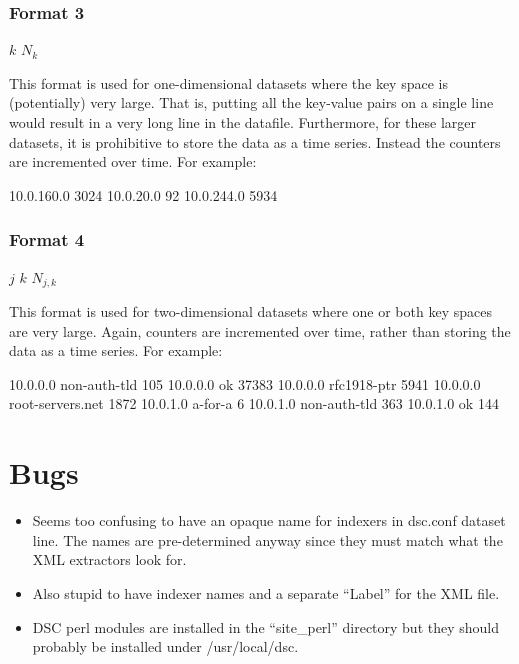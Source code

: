 \documentclass{report}
\begin{document}
\subsection{Format 3}

\noindent
\begin{tt}$k$ $N_{k}$
\end{tt}

\vspace{1ex}\noindent
This format is used for one-dimensional datasets where the key space
is (potentially) very large.  That is, putting all the key-value pairs
on a single line would result in a very long line in the datafile.
Furthermore, for these larger datasets, it is prohibitive to
store the data as a time series.  Instead the counters are incremented
over time.  For example:

\begin{MyVerbatim}
10.0.160.0 3024
10.0.20.0 92
10.0.244.0 5934
\end{MyVerbatim}

\subsection{Format 4}

\noindent
\begin{tt}$j$ $k$ $N_{j,k}$
\end{tt}

\vspace{1ex}\noindent
This format is used for two-dimensional datasets where one or both
key spaces are very large.  Again, counters are incremented over
time, rather than storing the data as a time series.
For example:

\begin{MyVerbatim}
10.0.0.0 non-auth-tld 105
10.0.0.0 ok 37383
10.0.0.0 rfc1918-ptr 5941
10.0.0.0 root-servers.net 1872
10.0.1.0 a-for-a 6
10.0.1.0 non-auth-tld 363
10.0.1.0 ok 144
\end{MyVerbatim}

\chapter{Bugs}

\begin{itemize}

\item
	Seems too confusing to have an opaque name for indexers in
	dsc.conf dataset line.  The names are pre-determined anyway
	since they must match what the XML extractors look for.
\item
	Also stupid to have indexer names and a separate ``Label'' for
	the XML file.

\item
	DSC perl modules are installed in the ``site\_perl'' directory
	but they should probably be installed under /usr/local/dsc.

\end{itemize}
\end{document}
